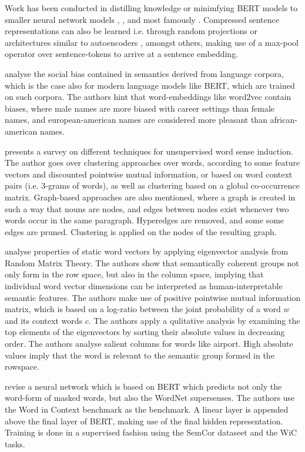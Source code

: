 \documentclass[a4paper,12pt,twoside,openright]{report}
\begin{document}
Work has been conducted in distilling knowledge or minimfying  BERT models to smaller neural network models \cite{tang19}, \cite{tsai19}, and most famously \cite{sanh19}.
Compressed sentence representations can also be learned i.e. through random projections or architectures similar to autoencoders \cite{shen19}, amongst others, making use of a max-pool operator over sentence-tokens to arrive at a sentence embedding.

\cite{caliskan19} analyse the social bias contained in semantics derived from language corpora, which is the case also for modern language models like BERT, which are trained on such corpora.
The authors hint that word-embeddings like word2vec contain biases, where male names are more biased with career settings than female names, and european-american names are considered more pleasant than african-american names.

\cite{denkowski09} presents a survey on different techniques for unsupervised word sense induction.
The author goes over clustering approaches over words, according to some feature vectors and discounted pointwise mutual information, or based on word context pairs (i.e. 3-grams of words), as well as clustering based on a global co-occurrence matrix.
Graph-based approaches are also mentioned, where a graph is created in such a way that nouns are nodes, and edges between nodes exist whenever two words occur in the same paragraph.
Hyperedges are removed, and some some edges are pruned.
Clustering is applied on the nodes of the resulting graph.

\cite{shin18} analyse properties of static word vectors by applying eigenvector analysis from Random Matrix Theory.
The authors show that semantically coherent groups not only form in the row space, but also in the column space, implying that individual word vector dimensions can be interpreted as human-interpretable semantic features.
The authors make use of positive pointwise mutual information matrix, which is based on a log-ratio between the joint probability of a word $w$ and its context words $c$.
The authors apply a qulitative analysis by examining the top elements of the eigenvectors by sorting their absolute values in decreasing order.
The authors analyse salient columns for words like airport.
High absolute values imply that the word is relevant to the semantic group formed in the rowspace.

\cite{levine19} revise a neural network which is based on BERT which predicts not only the word-form of masked words, but also the WordNet supersenses.
The authors use the Word in Context benchmark as the benchmark.
A linear layer is appended above the final layer of BERT, making use of the final hidden representation.
Training is done in a supervised fashion using the SemCor dataseet and the WiC tasks.
\end{document}
